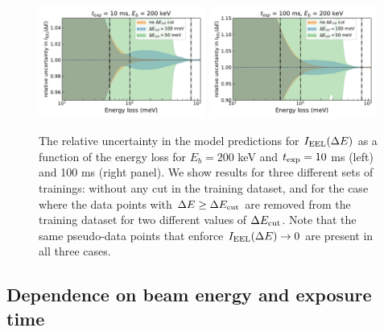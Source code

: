 \begin{figure}[t]
    \centering
    \includegraphics[width=0.49\textwidth]{plots/prediction_with_cut_10ms.pdf}
    \includegraphics[width=0.49\textwidth]{plots/prediction_with_cut_100ms.pdf}
    \caption{The relative uncertainty in the model predictions for $I_{\rm EEL}(\Delta E)$
      as a function of the energy loss for $E_b=200$ keV and $t_{\rm exp}=10$ ms (left)
      and 100 ms (right panel).
      We show results for three different sets of trainings: without any cut
      in the training dataset, and for the case where the data points with $\Delta E \ge \Delta E_{\rm cut}$
      are removed from the training dataset for two different values
      of $\Delta E_{\rm cut}$.
      Note that the same pseudo-data points that enforce $I_{\rm EEL}(\Delta E)\to 0$ are present
      in all three cases.
      \label{fig:EELS_vacuum_DeltaE}}
\end{figure}

\subsection{Dependence on  beam energy  and exposure time }
\label{eq:depebeam}


